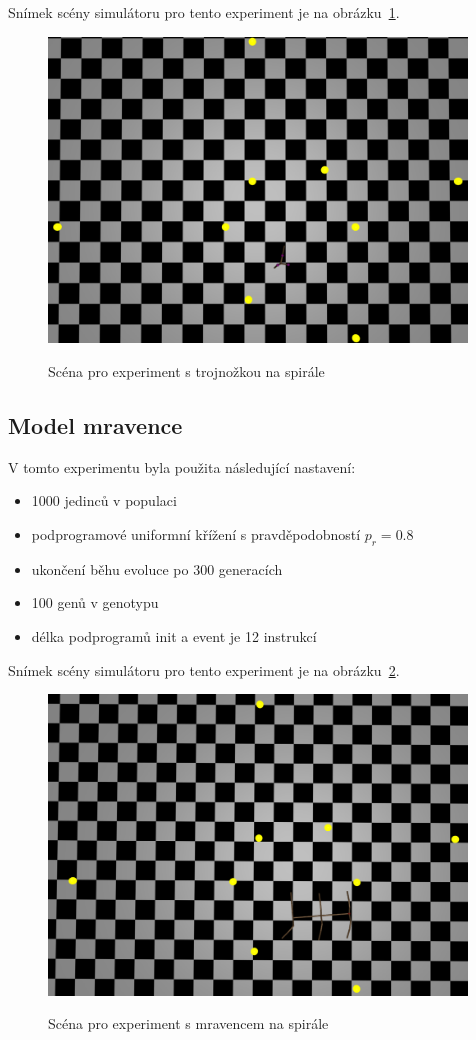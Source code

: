 Snímek scény simulátoru pro tento experiment je na obrázku~\ref{fig:trojnozka_spirala_zhora}.
\begin{figure}[h]
    \centering
    {\includegraphics[width=30em]{obrazky/trojnozka_spirala_zhora.png}}
    \caption{
    Scéna pro experiment s trojnožkou na spirále
    }
    \label{fig:trojnozka_spirala_zhora}
\end{figure}

\subsection{Model mravence}

V tomto experimentu byla použita následující nastavení:
\begin{itemize}
    \item 1000 jedinců v populaci
    \item podprogramové uniformní křížení s pravděpodobností $p_r = 0.8$
    \item ukončení běhu evoluce po 300 generacích
    \item 100 genů v genotypu
    \item délka podprogramů init a event je 12 instrukcí
\end{itemize}

Snímek scény simulátoru pro tento experiment je na obrázku~\ref{fig:mravenec_spirala_zhora}.
\begin{figure}[h]
    \centering
    {\includegraphics[width=30em]{obrazky/mravenec_spirala_zhora.png}}
    \caption{
    Scéna pro experiment s mravencem na spirále
    }
    \label{fig:mravenec_spirala_zhora}
\end{figure}


